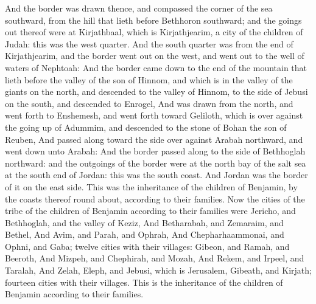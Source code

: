 \begin{biblechapter}
\verse And the border was drawn thence, and compassed the corner of the sea southward, from the hill that lieth before Bethhoron southward; and the goings out thereof were at Kirjathbaal, which is Kirjathjearim, a city of the children of Judah: this was the west quarter.
\verse And the south quarter was from the end of Kirjathjearim, and the border went out on the west, and went out to the well of waters of Nephtoah:
\verse And the border came down to the end of the mountain that lieth before the valley of the son of Hinnom, and which is in the valley of the giants on the north, and descended to the valley of Hinnom, to the side of Jebusi on the south, and descended to Enrogel,
\verse And was drawn from the north, and went forth to Enshemesh, and went forth toward Geliloth, which is over against the going up of Adummim, and descended to the stone of Bohan the son of Reuben,
\verse And passed along toward the side over against Arabah northward, and went down unto Arabah:
\verse And the border passed along to the side of Bethhoglah northward: and the outgoings of the border were at the north bay of the salt sea at the south end of Jordan: this was the south coast.
\verse And Jordan was the border of it on the east side. This was the inheritance of the children of Benjamin, by the coasts thereof round about, according to their families.
\verse Now the cities of the tribe of the children of Benjamin according to their families were Jericho, and Bethhoglah, and the valley of Keziz,
\verse And Betharabah, and Zemaraim, and Bethel,
\verse And Avim, and Parah, and Ophrah,
\verse And Chepharhaammonai, and Ophni, and Gaba; twelve cities with their villages:
\verse Gibeon, and Ramah, and Beeroth,
\verse And Mizpeh, and Chephirah, and Mozah,
\verse And Rekem, and Irpeel, and Taralah,
\verse And Zelah, Eleph, and Jebusi, which is Jerusalem, Gibeath, and Kirjath; fourteen cities with their villages. This is the inheritance of the children of Benjamin according to their families.
\end{biblechapter}

